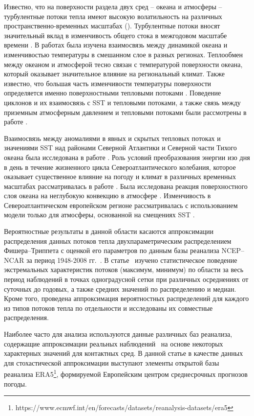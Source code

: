 Известно, что на поверхности раздела двух сред -- океана и атмосферы -- турбулентные потоки тепла имеют высокую волатильность на различных пространственно-временных масштабах (\cite{small2019air,tian2017air}).  Турбулентные потоки вносят значительный вклад в изменчивость общего стока в межгодовом масштабе времени \cite{bentamy2017review}.
В работах \cite{ashin2019observed, schmeisser2019role} была изучена взаимосвязь между динамикой океана и изменчивостью температуры в смешанном слое в разных регионах. Теплообмен между океаном и атмосферой тесно связан с температурой поверхности океана, который оказывает значительное влияние на региональный климат. Также известно, что большая часть изменчивости температуры поверхности определяется именно поверхностными тепловыми потоками \cite{patrizio2021quantifying}. 
Поведение циклонов и их взаимосвязь с SST и тепловыми потоками, а также связь между приземным атмосферным давлением и тепловыми потоками были рассмотрены в работе \cite{tilinina2018association}. 

Взаимосвязь между аномалиями в явных и скрытых тепловых потоках и значениями SST над районами Северной Атлантики и Северной части Тихого океана была исследована в работе  \cite{cayan1992latent}. Роль условий преобразования энергии изо дня в день в течение жизненного цикла Североатлантического колебания, которое оказывает существенное влияние на погоду и климат в различных временных масштабах рассматривалась в работе  \cite{kim2024phase}. Была исследована реакция поверхностного слоя океана на неглубокую конвекцию в атмосфере \cite{brilouet2024numerical}. Изменчивость в Североатлантическом европейском регионе рассматривалась с использованием модели только для атмосферы, основанной на смещениях SST \cite{keeley2012impact}. 

Вероятностные результаты в данной области касаются аппроксимации распределения данных потоков тепла двухпараметрическим распределением Фишера--Триппета с оценкой его параметров по данным базы реанализа NCEP--NCAR за период 1948-2008 гг.~\cite{gulev2012probability}. В статье~\cite{FAO} изучено статистическое поведение экстремальных характеристик потоков (максимум, минимум) по области за весь период наблюдений в точках одноградусной сетки при различных осреднениях от суточных до годовых, а также средних значений по распределению и медиан. Кроме того, проведена аппроксимация вероятностных распределений для каждого из типов потоков тепла по отдельности и исследованы их совместные распределения.

Наиболее часто для анализа используются данные различных баз реанализа, содержащие аппроксимации реальных наблюдений~\cite{cronin2019air,leyba2019trends} на основе некоторых характерных значений для контактных сред. В данной статье в качестве данных для стохастической аппроксимации выступают элементы открытой базы реанализа ERA5\footnote{https://www.ecmwf.int/en/forecasts/datasets/reanalysis-datasets/era5}, формируемой Европейским центром среднесрочных прогнозов погоды.

